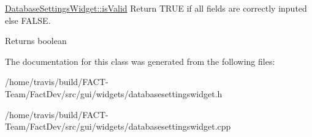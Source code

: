 \hyperlink{classGui_1_1Widgets_1_1DatabaseSettingsWidget_a8b7f1184a885ca63edce7957b74751c6}{Database\-Settings\-Widget\-::is\-Valid} Return T\-R\-U\-E if all fields are correctly inputed else F\-A\-L\-S\-E. 

\begin{DoxyReturn}{Returns}
boolean 
\end{DoxyReturn}


The documentation for this class was generated from the following files\-:\begin{DoxyCompactItemize}
\item 
/home/travis/build/\-F\-A\-C\-T-\/\-Team/\-Fact\-Dev/src/gui/widgets/databasesettingswidget.\-h\item 
/home/travis/build/\-F\-A\-C\-T-\/\-Team/\-Fact\-Dev/src/gui/widgets/databasesettingswidget.\-cpp\end{DoxyCompactItemize}
